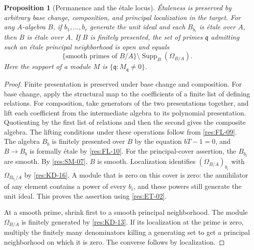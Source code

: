 \documentclass[11pt,oneside,openany]{book}
\newtheorem{proposition}[theorem]{Proposition}
\theoremstyle{definition}
\theoremstyle{remark}
\begin{document}
\begin{proposition}[Permanence and the \'etale locus]\label{res:ET-04}
\'Etaleness is preserved by arbitrary base change, composition, and
principal localization in the target. For any $A$-algebra $B$, if
$b_1,\ldots,b_r$ generate the unit ideal and each $B_{b_i}$ is
\'etale over $A$, then $B$ is \'{e}tale over $A$. If $B$ is finitely
presented, the set of primes $\mathfrak q$ admitting such an
\'etale principal neighborhood is open and equals
\[
 \{\text{smooth primes of }B/A\}\setminus
 \operatorname{Supp}_B(\Omega_{B/A}).
\]
Here the support of a module $M$ is
$\{\mathfrak q:M_{\mathfrak q}\ne0\}$.
\end{proposition}
\begin{proof}
Finite presentation is preserved under base change and composition.
For base change, apply the structural map to the coefficients of a
finite list of defining relations. For composition, take generators of
the two presentations together, and lift each coefficient from the
intermediate algebra to its polynomial presentation. Quotienting by
the first list of relations and then the second gives the composite
algebra. The lifting conditions under these operations follow from
\ref{res:FL-09}. The algebra $B_b$ is finitely presented over $B$
by the equation $bT-1=0$, and $B\to B_b$ is formally \'{e}tale by
\ref{res:FL-10}. For the principal-cover assertion, the $B_{b_i}$
are smooth. By \ref{res:SM-07}, $B$ is smooth. Localization
identifies $(\Omega_{B/A})_{b_i}$ with $\Omega_{B_{b_i}/A}$
by \ref{res:KD-16}. A module that is zero on this cover is zero:
the annihilator of any element contains a power of every $b_i$,
and these powers still generate the unit ideal. This proves the
assertion using \ref{res:ET-02}.

At a smooth prime, shrink first to a smooth principal neighborhood.
The module $\Omega_{B/A}$ is finitely generated by \ref{res:KD-13}.
If its localization at the prime is zero, multiply the finitely many
denominators killing a generating set to get a principal neighborhood
on which it is zero. The converse follows by localization.
\end{proof}
\end{document}
